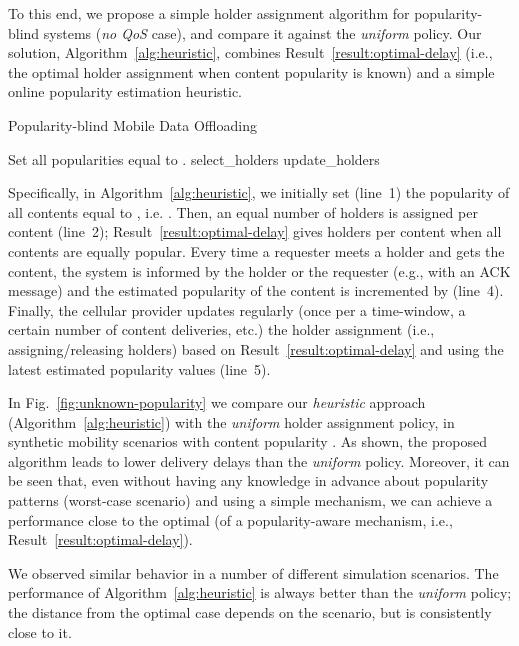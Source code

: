 \documentclass[journal]{IEEEtran}
\newcommand{\revisionRed}[1]{{#1}}\newcommand{\red}[1]{{#1}}
\begin{document}
\revisionRed{
To this end, we propose a simple holder assignment algorithm for popularity-blind systems (\textit{no QoS} case), and compare it against the \textit{uniform} policy. Our solution, Algorithm~\ref{alg:heuristic}, combines Result~\ref{result:optimal-delay} (i.e., the optimal holder assignment when content popularity is known) and a simple online popularity estimation heuristic.
}


\revisionRed{
\begin{algorithm}[h]
\caption{Popularity-blind Mobile Data Offloading}
\begin{algorithmic}[1]
\State  \Comment Set all popularities equal to .
\State  select\_holders 
\For {each content delivery of }
	\State 
	\State  update\_holders 
\EndFor
\end{algorithmic}
\label{alg:heuristic}
\end{algorithm}
}

\revisionRed{
Specifically, in Algorithm~\ref{alg:heuristic}, we initially set (line~1) the popularity of all contents equal to , i.e. . Then, an equal number of holders is assigned per content (line~2); Result~\ref{result:optimal-delay} gives  holders per content when all contents are equally popular. Every time a requester meets a holder and gets the content, the system is informed by the holder or the requester (e.g., with an ACK message) and the estimated popularity of the content is incremented by  (line~4). Finally, the cellular provider updates regularly (once per a time-window, a certain number of content deliveries, etc.) the holder assignment (i.e., assigning/releasing holders) based on Result~\ref{result:optimal-delay} and using the latest estimated popularity values (line~5).
}

\revisionRed{
In Fig.~\ref{fig:unknown-popularity} we compare our \textit{heuristic} approach (Algorithm~\ref{alg:heuristic}) with the \textit{uniform} holder assignment policy, in synthetic mobility scenarios  with content popularity . As shown, the proposed algorithm leads to lower delivery delays than the \textit{uniform} policy. Moreover, it can be seen that, even without having any knowledge in advance about popularity patterns (worst-case scenario) and using a simple mechanism, we can achieve a performance close to the optimal (of a popularity-aware mechanism, i.e., Result~\ref{result:optimal-delay}). 
}

\revisionRed{
We observed similar behavior in a number of different simulation scenarios. The performance of Algorithm~\ref{alg:heuristic} is always better than the \textit{uniform} policy; the distance from the optimal case depends on the scenario, but is consistently close to it.
}
\end{document}
